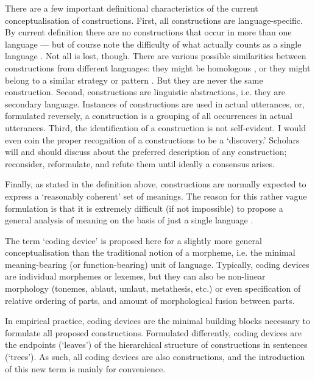 There are a few important definitional characteristics of the current conceptualisation of constructions. First, all constructions are language-specific. By current definition there are no constructions that occur in more than one language --- but of course note the difficulty of what actually counts as a single language . Not all is lost, though. There are various possible similarities between constructions from different languages: they might be homologous , or they might belong to a similar strategy  or pattern . But they are never the same construction. Second, constructions are linguistic abstractions, i.e. they are secondary language. Instances of constructions are used in actual utterances, or, formulated reversely, a construction is a grouping of all occurrences in actual utterances. Third, the identification of a construction is not self-evident. I would even coin the proper recognition of a constructions to be a `discovery.' Scholars will and should discuss about the preferred description of any construction; reconsider, reformulate, and refute them until ideally a consensus arises.

Finally, as stated in the definition above, constructions are normally expected to express a `reasonably coherent' set of meanings. The reason for this rather vague formulation is that it is extremely difficult (if not impossible) to propose a general analysis of meaning on the basis of just a single language .

%
The term `coding device' is proposed here for a slightly more general conceptualisation than the traditional notion of a morpheme, i.e. the minimal meaning-bearing (or function-bearing) unit of language. Typically, coding devices are individual morphemes or lexemes, but they can also be non-linear morphology (tonemes, ablaut, umlaut, metathesis, etc.) or even specification of relative ordering of parts, and amount of morphological fusion between parts.

In empirical practice, coding devices are the minimal building blocks necessary to formulate all proposed constructions. Formulated differently, coding devices are the endpoints (`leaves') of the hierarchical structure of constructions in sentences (`trees'). As such, all coding devices are also constructions, and the introduction of this new term is mainly for convenience.

